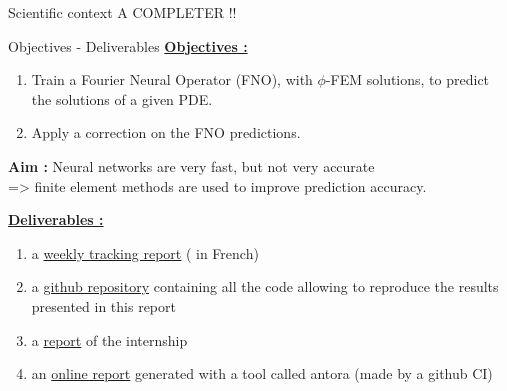 \documentclass[compress,10pt,xcolor={table,dvipsnames},t]{beamer}
\begin{document}
	\begin{frame}{Scientific context}
		\color{red}A COMPLETER !!\color{black}
	\end{frame}

	\begin{frame}{Objectives - Deliverables}
		\underline{\textbf{Objectives :}} \\
		\begin{enumerate}[\ding{217}]
			\item Train a Fourier Neural Operator (FNO), with $\phi$-FEM solutions, to predict the solutions of a given PDE.
			\item Apply a correction on the FNO predictions.
		\end{enumerate}
		\textbf{Aim :} Neural networks are very fast, but not very accurate \\
		=> finite element methods are used to improve prediction accuracy.
		
		\underline{\textbf{Deliverables :}}

		\begin{enumerate}[\ding{217}]
			\item a \href{https://github.com/flecourtier/phifem_stage/blob/main/docs/suivi/suivi.pdf}{weekly tracking report} ( in French)
			\item a \href{https://github.com/flecourtier/phifem_stage}{github repository} containing all the code allowing to reproduce the results presented in this report
			\item a \href{https://csmi.cemosis.fr/csmi-stages-2023/m2/_attachments/Lecourtier-Fr\%C3\%A9d\%C3\%A9rique.pdf}{report} of the internship
			\item an \href{https://flecourtier.github.io/phifem_stage/phifem_project/1.0.3/main_page.html}{online report} generated with a tool called antora (made by a github CI)
		\end{enumerate}
	\end{frame}
\end{document}
